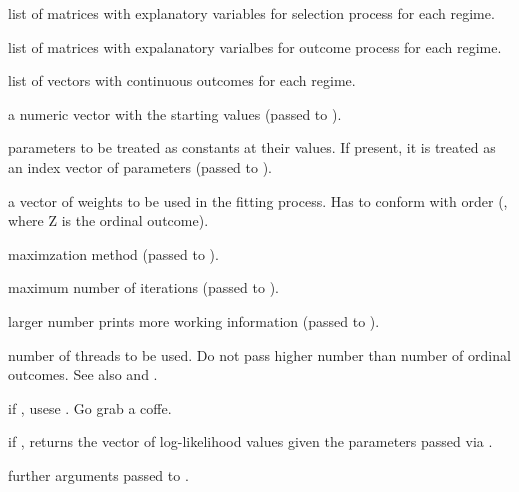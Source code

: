 \documentclass[letterpaper]{book}
\begin{document}
\begin{Arguments}
\begin{ldescription}
\item[\code{Ws}] list of matrices with explanatory variables for selection process for each regime.

\item[\code{Xs}] list of matrices with expalanatory varialbes for outcome process for each regime.

\item[\code{Ys}] list of vectors with continuous outcomes for each regime.

\item[\code{start}] a numeric vector with the starting values (passed to ).

\item[\code{fixed}] parameters to be treated as constants at their  values. If
present, it is treated as an index vector of  parameters (passed to ).

\item[\code{weights}] a vector of weights to be used in the fitting process. Has to
conform with order (, where Z is the ordinal
outcome).

\item[\code{method}] maximzation method (passed to ).

\item[\code{iterlim}] maximum number of iterations (passed to ).

\item[\code{printLevel}] larger number prints more working information (passed to ).

\item[\code{nThreads}] number of threads to be used. Do not pass higher number than
number of ordinal outcomes. See also  and .

\item[\code{.useR}] if , usese . Go grab a coffe.

\item[\code{.loglik}] if , returns the vector of log-likelihood values given
the parameters passed via .

\item[\code{...}] further arguments passed to .
\end{ldescription}
\end{Arguments}
\end{document}
